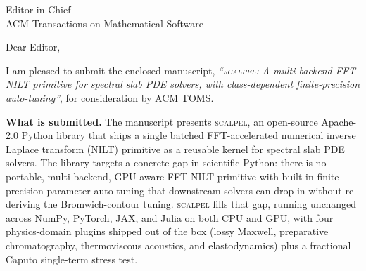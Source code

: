 \documentclass[11pt]{letter}
\begin{document}
\begin{letter}{Editor-in-Chief \\ ACM Transactions on Mathematical Software}

\opening{Dear Editor,}

I am pleased to submit the enclosed manuscript, \emph{``\textsc{scalpel}: A multi-backend FFT-NILT primitive for spectral slab PDE solvers, with class-dependent finite-precision auto-tuning''}, for consideration by ACM TOMS.

\medskip\noindent\textbf{What is submitted.}
The manuscript presents \textsc{scalpel}, an open-source Apache-2.0 Python library that ships a single batched FFT-accelerated numerical inverse Laplace transform (NILT) primitive as a reusable kernel for spectral slab PDE solvers. The library targets a concrete gap in scientific Python: there is no portable, multi-backend, GPU-aware FFT-NILT primitive with built-in finite-precision parameter auto-tuning that downstream solvers can drop in without re-deriving the Bromwich-contour tuning. \textsc{scalpel} fills that gap, running unchanged across NumPy, PyTorch, JAX, and Julia on both CPU and GPU, with four physics-domain plugins shipped out of the box (lossy Maxwell, preparative chromatography, thermoviscous acoustics, and elastodynamics) plus a fractional Caputo single-term stress test.


\end{letter}
\end{document}
